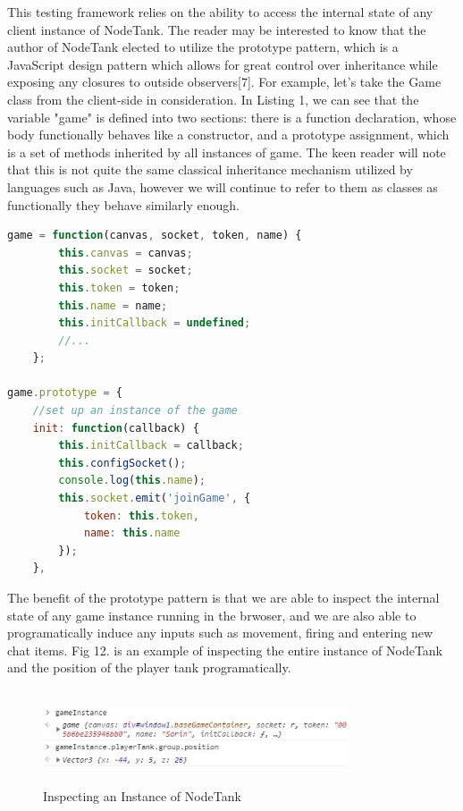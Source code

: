 \documentclass[conference]{IEEEtran}
\begin{document}
This testing framework relies on the ability to access the internal state of any client instance of NodeTank. The reader may be interested to know that the author of NodeTank 
elected to utilize the prototype pattern, which is a JavaScript design pattern which allows for great control over inheritance while exposing any closures to outside observers[7]. For example, 
let's take the Game class from the client-side in consideration. In Listing 1, we can see that the variable "game" is defined into two sections: there is a function declaration, whose body functionally 
behaves like a constructor, and a prototype assignment, which is a set of methods inherited by all instances of game. The keen reader will note that this is not quite the same classical inheritance
mechanism utilized by languages such as Java, however we will continue to refer to them as classes as functionally they behave similarly enough.

\begin{lstlisting}[language=JavaScript,caption={Snippet of the Game Class}]
    game = function(canvas, socket, token, name) {
		this.canvas = canvas;
		this.socket = socket;
		this.token = token;
		this.name = name;
		this.initCallback = undefined;
		//...
	};

game.prototype = {
    //set up an instance of the game
    init: function(callback) {
        this.initCallback = callback;
        this.configSocket();
        console.log(this.name);
        this.socket.emit('joinGame', {
            token: this.token,
            name: this.name
        });
    },
\end{lstlisting}


The benefit of the prototype pattern is that we are able to inspect the internal state of any game instance running in the brwoser, and we are also able to programatically induce 
any inputs such as movement, firing and entering new chat items. Fig 12. is an example of inspecting the entire instance of NodeTank and the position of the player tank programatically.

\begin{figure}[htbp]
\centerline{\includegraphics [width = 9cm, height = 2.8cm] {GameInspection.jpg}}
\caption{Inspecting an Instance of NodeTank}
\end{figure}
\end{document}
